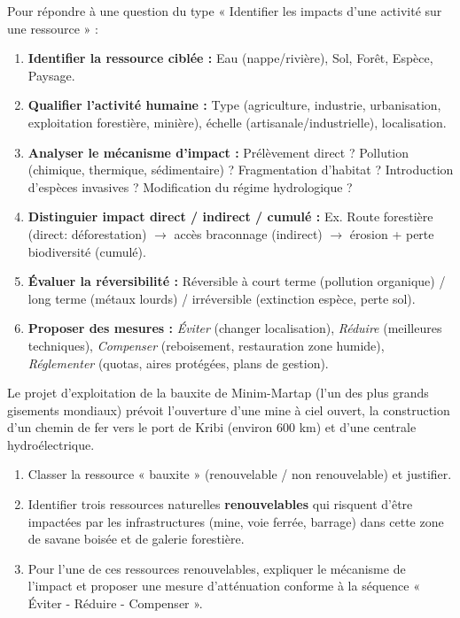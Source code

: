 \documentclass[11pt]{article}
\begin{document}
\begin{methode}
Pour répondre à une question du type « Identifier les impacts d'une activité sur une ressource » :
\begin{enumerate}
    \item \textbf{Identifier la ressource ciblée :} Eau (nappe/rivière), Sol, Forêt, Espèce, Paysage.
    \item \textbf{Qualifier l'activité humaine :} Type (agriculture, industrie, urbanisation, exploitation forestière, minière), échelle (artisanale/industrielle), localisation.
    \item \textbf{Analyser le mécanisme d'impact :} Prélèvement direct ? Pollution (chimique, thermique, sédimentaire) ? Fragmentation d'habitat ? Introduction d'espèces invasives ? Modification du régime hydrologique ?
    \item \textbf{Distinguier impact direct / indirect / cumulé :} Ex. Route forestière (direct: déforestation) $\rightarrow$ accès braconnage (indirect) $\rightarrow$ érosion + perte biodiversité (cumulé).
    \item \textbf{Évaluer la réversibilité :} Réversible à court terme (pollution organique) / long terme (métaux lourds) / irréversible (extinction espèce, perte sol).
    \item \textbf{Proposer des mesures :} \emph{Éviter} (changer localisation), \emph{Réduire} (meilleures techniques), \emph{Compenser} (reboisement, restauration zone humide), \emph{Réglementer} (quotas, aires protégées, plans de gestion).
\end{enumerate}
\end{methode}

\begin{exercice}
Le projet d'exploitation de la bauxite de Minim-Martap (l'un des plus grands gisements mondiaux) prévoit l'ouverture d'une mine à ciel ouvert, la construction d'un chemin de fer vers le port de Kribi (environ 600 km) et d'une centrale hydroélectrique. 
\begin{enumerate}
    \item Classer la ressource « bauxite » (renouvelable / non renouvelable) et justifier.
    \item Identifier trois ressources naturelles \textbf{renouvelables} qui risquent d'être impactées par les infrastructures (mine, voie ferrée, barrage) dans cette zone de savane boisée et de galerie forestière.
    \item Pour l'une de ces ressources renouvelables, expliquer le mécanisme de l'impact et proposer une mesure d'atténuation conforme à la séquence « Éviter - Réduire - Compenser ».
\end{enumerate}
\end{exercice}
\end{document}
